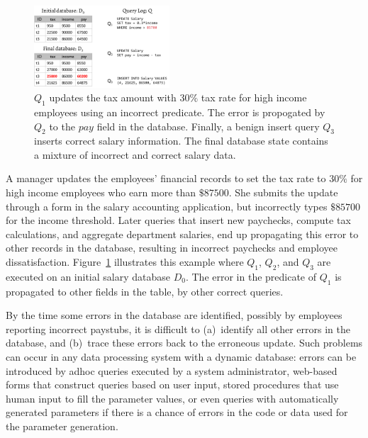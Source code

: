 \begin{figure}[t]
    \centering
        \includegraphics[width=0.45\textwidth]{figures/example2}
    \caption{\small $Q_1$ updates the tax amount with $30\%$ tax rate 
      for high income employees using an incorrect predicate.  
      The error is propogated by $Q_2$ to the $pay$ field in the database.
      Finally, a benign insert query $Q_3$ inserts correct salary information. 
      The final database state contains a mixture of incorrect and correct salary data.
    }
    \vspace*{-.2in}
    \label{fig:example}
\end{figure}
\begin{example}\label{ex:telco}
  A manager updates the employees' financial records to set the tax rate to $30\%$ for high income employees who earn more than $\$87500$.
  She submits the update through a form in the salary accounting application, 
  but incorrectly types $\$85700$ for the income threshold.  
  Later queries that insert new paychecks, compute tax calculations, and
  aggregate department salaries, end up propagating this error to other records in the database, resulting in incorrect paychecks and
  employee dissatisfaction.  Figure~\ref{fig:example} illustrates this example where $Q_1$, $Q_2$, and $Q_3$ are executed on an 
  initial salary database $D_0$.  The error in the predicate of $Q_1$ is propagated to other fields in the table, by other correct queries.
\end{example}
By the time some errors in the database are identified, possibly by
employees reporting incorrect paystubs, it is difficult to
(a)~identify all other errors in the database, and (b)~trace these
errors back to the erroneous update. Such problems can occur in any
data processing system with a dynamic database: errors can be
introduced by adhoc queries executed by a system administrator,
web-based forms that construct queries based on user input, stored
procedures that use human input to fill the parameter values, or even
queries with automatically generated parameters if there is a chance of
errors in the code or data used for the parameter generation.